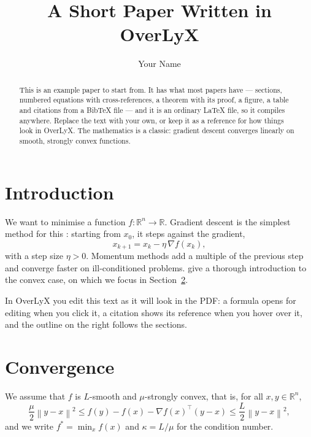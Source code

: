 \documentclass[11pt]{article}
\newcommand{\R}{\mathbb{R}}
\newcommand{\norm}[1]{\left\lVert #1\right\rVert}
\begin{document}
\title{A Short Paper Written in OverLyX}
\author{Your Name}
\maketitle
\begin{abstract}
This is an example paper to start from. It has what most papers have --- sections, numbered equations with cross-references, a theorem with its proof, a figure, a table and citations from a Bib\TeX{} file --- and it is an ordinary \LaTeX{} file, so it compiles anywhere. Replace the text with your own, or keep it as a reference for how things look in OverLyX. The mathematics is a classic: gradient descent converges linearly on smooth, strongly convex functions.
\end{abstract}

\section{Introduction}\label{sec:intro}

We want to minimise a function $f\colon\R^{n}\to\R$. Gradient descent is the simplest method for this \citep{nocedal2006numerical}: starting from $x_{0}$, it steps against the gradient,
\begin{equation}
x_{k+1}=x_{k}-\eta\,\nabla f(x_{k}),\label{eq:gd}
\end{equation}
with a step size $\eta>0$. Momentum methods \citep{polyak1964some,nesterov1983method} add a multiple of the previous step and converge faster on ill-conditioned problems. \citet{boyd2004convex} give a thorough introduction to the convex case, on which we focus in Section~\ref{sec:theory}.

In OverLyX you edit this text as it will look in the PDF: a formula opens for editing when you click it, a citation shows its reference when you hover over it, and the outline on the right follows the sections.

\section{Convergence}\label{sec:theory}

We assume that $f$ is $L$-smooth and $\mu$-strongly convex, that is, for all $x,y\in\R^{n}$,
\begin{equation}
\frac{\mu}{2}\norm{y-x}^{2}\le f(y)-f(x)-\nabla f(x)^{\top}(y-x)\le\frac{L}{2}\norm{y-x}^{2},\label{eq:assumptions}
\end{equation}
and we write $f^{\ast}=\min_{x}f(x)$ and $\kappa=L/\mu$ for the condition number.
\end{document}
